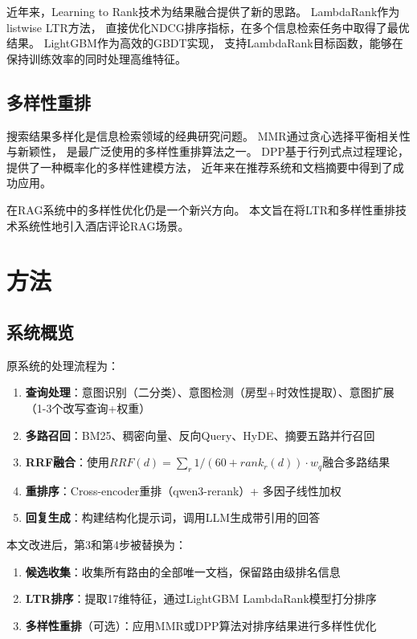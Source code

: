 \documentclass[10pt,a4paper]{article}
\begin{document}
近年来，Learning to Rank\cite{liu2009ltr}技术为结果融合提供了新的思路。
LambdaRank\cite{burges2010lambdarank}作为listwise LTR方法，
直接优化NDCG排序指标，在多个信息检索任务中取得了最优结果。
LightGBM\cite{ke2017lightgbm}作为高效的GBDT实现，
支持LambdaRank目标函数，能够在保持训练效率的同时处理高维特征。

\subsection{多样性重排}

搜索结果多样化是信息检索领域的经典研究问题\cite{agrawal2009diversifying}。
MMR\cite{carbonell1998mmr}通过贪心选择平衡相关性与新颖性，
是最广泛使用的多样性重排算法之一。
DPP\cite{kulesza2012dpp}基于行列式点过程理论，
提供了一种概率化的多样性建模方法，
近年来在推荐系统\cite{chen2018dpp}和文档摘要\cite{cho2019dpp}中得到了成功应用。

在RAG系统中的多样性优化仍是一个新兴方向\cite{rau2024rag}。
本文旨在将LTR和多样性重排技术系统性地引入酒店评论RAG场景。

\section{方法}

\subsection{系统概览}

原系统的处理流程为：

\begin{enumerate}[leftmargin=*]
    \item \textbf{查询处理}：意图识别（二分类）、意图检测（房型+时效性提取）、意图扩展（1-3个改写查询+权重）
    \item \textbf{多路召回}：BM25、稠密向量、反向Query、HyDE、摘要五路并行召回
    \item \textbf{RRF融合}：使用$RRF(d)=\sum_r 1/(60+rank_r(d)) \cdot w_q$融合多路结果
    \item \textbf{重排序}：Cross-encoder重排（qwen3-rerank）+ 多因子线性加权
    \item \textbf{回复生成}：构建结构化提示词，调用LLM生成带引用的回答
\end{enumerate}

本文改进后，第3和第4步被替换为：

\begin{enumerate}[leftmargin=*,start=3]
    \item \textbf{候选收集}：收集所有路由的全部唯一文档，保留路由级排名信息
    \item \textbf{LTR排序}：提取17维特征，通过LightGBM LambdaRank模型打分排序
    \item \textbf{多样性重排}（可选）：应用MMR或DPP算法对排序结果进行多样性优化
\end{enumerate}
\end{document}
